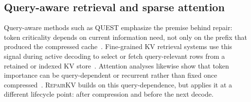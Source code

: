 \documentclass{article}
\newcommand{\repairkv}{\textsc{RepairKV}}
\begin{document}
\subsection{Query-aware retrieval and sparse attention}
Query-aware methods such as QUEST {emphasize the premise behind repair: token criticality depends on current information need, not only on the prefix that produced the compressed cache~\citep{quest}}. Fine-grained KV retrieval systems use this signal during active decoding to select or fetch query-relevant rows from a retained or indexed KV store~\citep{quest,fier,pariskv,shadowkv}. Attention analyses likewise show that token importance can be query-dependent or recurrent rather than fixed once compressed~\citep{retrieval_heads,lazy_eviction}. {\repairkv{} builds on this query-dependence, but applies it at a different lifecycle point: after compression and before the next decode.}
\end{document}
